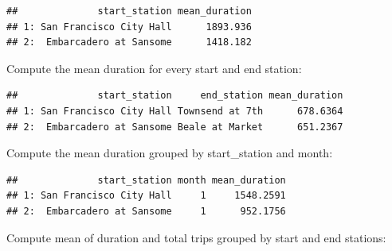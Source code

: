 \documentclass[]{book}
\newenvironment{Shaded}{\begin{snugshade}}{\end{snugshade}}
\newcommand{\DataTypeTok}[1]{\textcolor[rgb]{0.13,0.29,0.53}{#1}}
\newcommand{\DecValTok}[1]{\textcolor[rgb]{0.00,0.00,0.81}{#1}}
\newcommand{\KeywordTok}[1]{\textcolor[rgb]{0.13,0.29,0.53}{\textbf{#1}}}
\newcommand{\NormalTok}[1]{#1}
\newcommand{\OperatorTok}[1]{\textcolor[rgb]{0.81,0.36,0.00}{\textbf{#1}}}
\newcommand{\StringTok}[1]{\textcolor[rgb]{0.31,0.60,0.02}{#1}}
\begin{document}
\begin{verbatim}
##              start_station mean_duration
## 1: San Francisco City Hall      1893.936
## 2:  Embarcadero at Sansome      1418.182
\end{verbatim}

Compute the mean duration for every start and end station:

\begin{Shaded}
\end{Shaded}

\begin{verbatim}
##              start_station     end_station mean_duration
## 1: San Francisco City Hall Townsend at 7th      678.6364
## 2:  Embarcadero at Sansome Beale at Market      651.2367
\end{verbatim}

Compute the mean duration grouped by start\_station and month:

\begin{Shaded}
\end{Shaded}

\begin{verbatim}
##              start_station month mean_duration
## 1: San Francisco City Hall     1     1548.2591
## 2:  Embarcadero at Sansome     1      952.1756
\end{verbatim}

Compute mean of duration and total trips grouped by start and end stations:

\begin{Shaded}
\end{Shaded}
\end{document}
